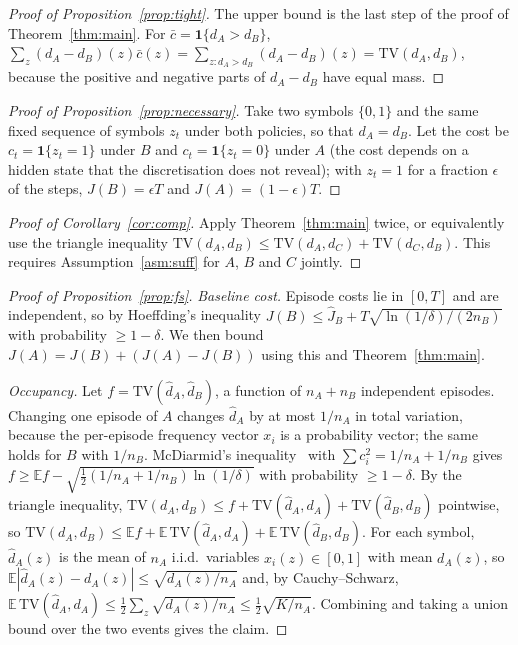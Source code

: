 \documentclass{article}
\newcommand{\TV}{\mathrm{TV}}
\begin{document}
\begin{proof}[Proof of Proposition~\ref{prop:tight}]
The upper bound is the last step of the proof of Theorem~\ref{thm:main}. For $\bar c=\mathbf 1\{d_A>d_B\}$, $\sum_z(d_A-d_B)(z)\bar c(z)=\sum_{z:d_A>d_B}(d_A-d_B)(z)=\TV(d_A,d_B)$, because the positive and negative parts of $d_A-d_B$ have equal mass.
\end{proof}

\begin{proof}[Proof of Proposition~\ref{prop:necessary}]
Take two symbols $\{0,1\}$ and the same fixed sequence of symbols $z_t$ under both policies, so that $d_A=d_B$. Let the cost be $c_t=\mathbf 1\{z_t=1\}$ under $B$ and $c_t=\mathbf 1\{z_t=0\}$ under $A$ (the cost depends on a hidden state that the discretisation does not reveal); with $z_t=1$ for a fraction $\epsilon$ of the steps, $J(B)=\epsilon T$ and $J(A)=(1-\epsilon)T$.
\end{proof}

\begin{proof}[Proof of Corollary~\ref{cor:comp}]
Apply Theorem~\ref{thm:main} twice, or equivalently use the triangle inequality $\TV(d_A,d_B)\le\TV(d_A,d_C)+\TV(d_C,d_B)$. This requires Assumption~\ref{asm:suff} for $A$, $B$ and $C$ jointly.
\end{proof}

\begin{proof}[Proof of Proposition~\ref{prop:fs}]
\emph{Baseline cost.} Episode costs lie in $[0,T]$ and are independent, so by Hoeffding's inequality $J(B)\le\hat J_B+T\sqrt{\ln(1/\delta)/(2n_B)}$ with probability $\ge1-\delta$. We then bound $J(A)=J(B)+(J(A)-J(B))$ using this and Theorem~\ref{thm:main}.

\emph{Occupancy.} Let $f=\TV(\hat d_A,\hat d_B)$, a function of $n_A+n_B$ independent episodes. Changing one episode of $A$ changes $\hat d_A$ by at most $1/n_A$ in total variation, because the per-episode frequency vector $x_i$ is a probability vector; the same holds for $B$ with $1/n_B$. McDiarmid's inequality~\citep{mcdiarmid1989bounded} with $\sum c_i^2=1/n_A+1/n_B$ gives $f\ge\mathbb E f-\sqrt{\tfrac12(1/n_A+1/n_B)\ln(1/\delta)}$ with probability $\ge1-\delta$. By the triangle inequality, $\TV(d_A,d_B)\le f+\TV(\hat d_A,d_A)+\TV(\hat d_B,d_B)$ pointwise, so $\TV(d_A,d_B)\le\mathbb E f+\mathbb E\,\TV(\hat d_A,d_A)+\mathbb E\,\TV(\hat d_B,d_B)$. For each symbol, $\hat d_A(z)$ is the mean of $n_A$ i.i.d.\ variables $x_i(z)\in[0,1]$ with mean $d_A(z)$, so $\mathbb E|\hat d_A(z)-d_A(z)|\le\sqrt{d_A(z)/n_A}$ and, by Cauchy--Schwarz, $\mathbb E\,\TV(\hat d_A,d_A)\le\tfrac12\sum_z\sqrt{d_A(z)/n_A}\le\tfrac12\sqrt{K/n_A}$. Combining and taking a union bound over the two events gives the claim.
\end{proof}
\end{document}

